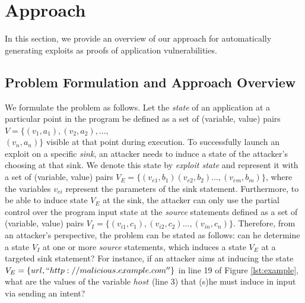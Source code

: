 \section{Approach}
\label{sec:approach}


In this section, we provide an overview of our approach for automatically generating exploits as proofs of application vulnerabilities.

\subsection{Problem Formulation and Approach Overview} We formulate the problem as follows. Let the \textit{state} of an application at a particular point in the program be defined as a set of (variable, value) pairs $V = \{(v_1, a_1), (v_2, a_2), ...,$ \\
$ (v_n, a_n)\}$ visible at that point during execution. 
To successfully launch an exploit on a specific \textit{sink}, an attacker needs to induce a state of the attacker's choosing at that sink. We denote this state by \textit{exploit state} and represent it with a set of (variable, value) pairs $V_E = \{(v_{e1}, b_1) (v_{e2}, b_2) ..., (v_{em}, b_m)\}$, where the variables $v_{ei}$ represent the parameters of the sink statement. Furthermore, to be able to induce state $V_E$ at the sink, the attacker can only use the partial control over the program input state at the \textit{source} statements defined as a set of (variable, value) pairs $V_I = \{(v_{i1}, c_1), (v_{i2}, c_2) ..., (v_{in}, c_n)\}$. Therefore, from an attacker's perspective, the problem can be stated as follows: can he determine a state $V_I$ at one or more \textit{source} statements, which induces a state $V_E$ at a targeted sink statement? 
{\color{orange} For instance, if an attacker aims at inducing the state $V_E = \{ url, ``http://malicious.example.com''\}$ in line 19 of Figure \ref{lst:example}, what are the values of the variable $host$ (line 3) that (s)he must induce in input via sending an intent?}

